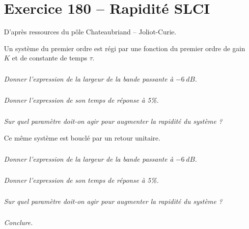 \section*{Exercice 180 -- Rapidité SLCI}
\setcounter{exo}{0}

D'après ressources du pôle Chateaubriand -- Joliot-Curie.

Un système du premier ordre est régi par une fonction du premier ordre de gain $K$ et de constante de temps $\tau$.


\subparagraph{}
\textit{Donner l’expression de la largeur de la bande passante à $\SI{-6}{dB}$.}
\ifprof
\begin{corrige}

\end{corrige}
\else
\fi

\subparagraph{}
\textit{Donner l’expression de son temps de réponse à 5\%.}
\ifprof
\begin{corrige}

\end{corrige}
\else
\fi

\subparagraph{}
\textit{Sur quel paramètre doit-on agir pour augmenter la rapidité du système ?}
\ifprof
\begin{corrige}

\end{corrige}
\else
\fi

Ce même système est bouclé par un retour unitaire.

\subparagraph{}
\textit{Donner l’expression de la largeur de la bande passante à $\SI{-6}{dB}$.}
\ifprof
\begin{corrige}

\end{corrige}
\else
\fi

\subparagraph{}
\textit{Donner l’expression de son temps de réponse à 5\%. }
\ifprof
\begin{corrige}

\end{corrige}
\else
\fi

\subparagraph{}
\textit{Sur quel paramètre doit-on agir pour augmenter la rapidité du système ?}
\ifprof
\begin{corrige}

\end{corrige}
\else
\fi

\subparagraph{}
\textit{Conclure.}
\ifprof
\begin{corrige}

\end{corrige}
\else
\fi
